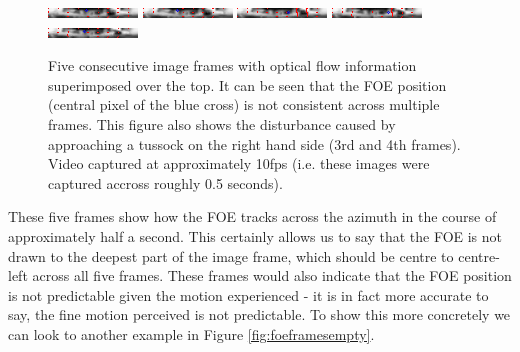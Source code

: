 \documentclass[a4paper,11pt,twoside,openright]{article}
\begin{document}
\begin{figure}[h!]
  \centering
  \includegraphics[width=\textwidth]{frame_00057}
  \includegraphics[width=\textwidth]{frame_00058}
  \includegraphics[width=\textwidth]{frame_00059}
  \includegraphics[width=\textwidth]{frame_00060}
  \includegraphics[width=\textwidth]{frame_00061}
  \caption{\label{fig:foeframes} Five consecutive image frames with
    optical flow information superimposed over the top. It can be seen
    that the FOE position (central pixel of the blue cross) is not
    consistent across multiple frames. This figure also shows the
    disturbance caused by approaching a tussock on the right hand side
    (3rd and 4th frames). Video captured at approximately 10fps
    (i.e. these images were captured accross roughly 0.5 seconds).
  }
\end{figure}

These five frames show how the FOE tracks across the azimuth in the
course of approximately half a second. This certainly allows us to say
that the FOE is not drawn to the deepest part of the image frame,
which should be centre to centre-left across all five frames. These
frames would also indicate that the FOE position is not predictable
given the motion experienced - it is in fact more accurate to say, the
fine motion perceived is not predictable. To show this more concretely
we can look to another example in Figure \ref{fig:foeframesempty}.
\newline\par
\end{document}
